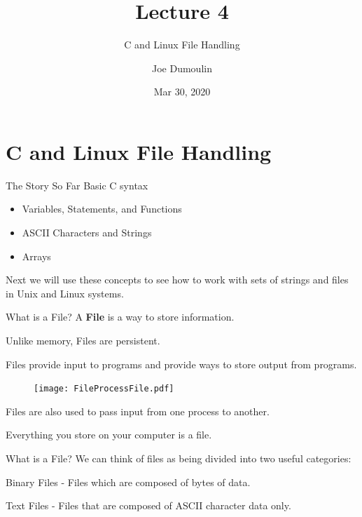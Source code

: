 \documentclass[10pt]{beamer}
\title{Lecture 4}
\subtitle{C and Linux File Handling}
\date{Mar 30, 2020}
\author{Joe Dumoulin}
\institute{Eastern Washington University}
\begin{document}
\maketitle
\section{C and Linux File Handling} 



\begin{frame}[fragile]{The Story So Far}
Basic C syntax

\begin{itemize}

\item Variables, Statements, and Functions
\item ASCII Characters and Strings
\item Arrays

\end{itemize}

Next we will use these concepts to see how to work with sets of strings and files in Unix and Linux systems.

\end{frame}
\begin{frame}[fragile]{What is a File?}
A \textbf{File} is a way to store information.

Unlike memory, Files are persistent.

Files provide input to programs and provide ways to store output from programs.

\begin{figure}[htp]
    \centering
    \texttt{[image: FileProcessFile.pdf]}
    \label{fig:FilesAndProcess}
\end{figure}

Files are also used to pass input from one process to another.

Everything you store on your computer is a file.

\end{frame}
\begin{frame}[fragile]{What is a File?}
We can think of files as being divided into two useful categories:

Binary Files - Files which are composed of bytes of data.

Text Files - Files that are composed of ASCII character data only.

\end{frame}
\end{document}
